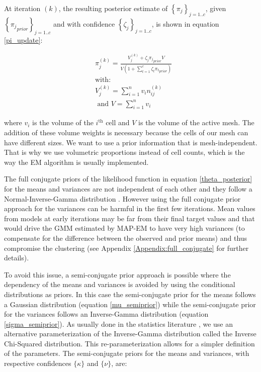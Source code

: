 \documentclass[extra]{gji} %
\begin{document}
At iteration $(k)$, the resulting posterior estimate of $\left\{\pi_j\right\}_{j=1..c}$, given $\left\{{\pi_j}_{prior}\right\}_{j=1..c}$ and with confidence $\left\{\zeta_j\right\}_{j=1..c}$, is shown in equation \ref{pi_update}:

\begin{align}
&\pi^{(k)}_j = \frac{V_{j}^{(k)}+\zeta_j {\pi_j}_{prior}V}{V(1+\sum_{t=1}^c \zeta_t {\pi_t}_{prior})} \label{pi_update}\\
&\text{with:} \nonumber\\
&V_{j}^{(k)} = \sum^n_{i=1} v_i n_{ij}^{(k)} \label{VolumeProportions}\\
&\text{ and } V=\sum^n_{i=1} v_i
\end{align}

where $v_i$ is the volume of the $i^\text{th}$ cell and $V$ is the volume of the active mesh. The addition of these volume weights is necessary because the cells of our mesh can have different sizes. We want to use a prior information that is mesh-independent. That is why we use volumetric proportions instead of cell counts, which is the way the EM algorithm is usually implemented.

The full conjugate priors of the likelihood function in equation \ref{theta_posterior} for the means and variances are not independent of each other and they follow a Normal-Inverse-Gamma distribution \citep{Murphy:2012:MLP:2380985}. However using the full conjugate prior approach for the variances can be harmful in the first few iterations. Mean values from models at early iterations may be far from their final target values and that would drive the GMM estimated by MAP-EM to have very high variances (to compensate for the difference between the observed and prior means) and thus compromise the clustering (see Appendix \ref{Appendix:full_conjugate} for further details).

To avoid this issue, a semi-conjugate prior approach is possible where the dependency of the means and variances is avoided by using the conditional distributions as priors. In this case the semi-conjugate prior for the means follows a Gaussian distribution (equation \ref{mu_semiprior}) while the semi-conjugate prior for the variances follows an Inverse-Gamma distribution (equation \ref{sigma_semiprior}). As usually done in the statistics literature \citep{Murphy:2012:MLP:2380985}, we use an alternative parameterization of the Inverse-Gamma distribution called the Inverse Chi-Squared distribution. This re-parameterization allows for a simpler definition of the parameters. The semi-conjugate priors for the means and variances, with respective confidences $\{\kappa\}$ and $\{\nu\}$, are:
\end{document}

